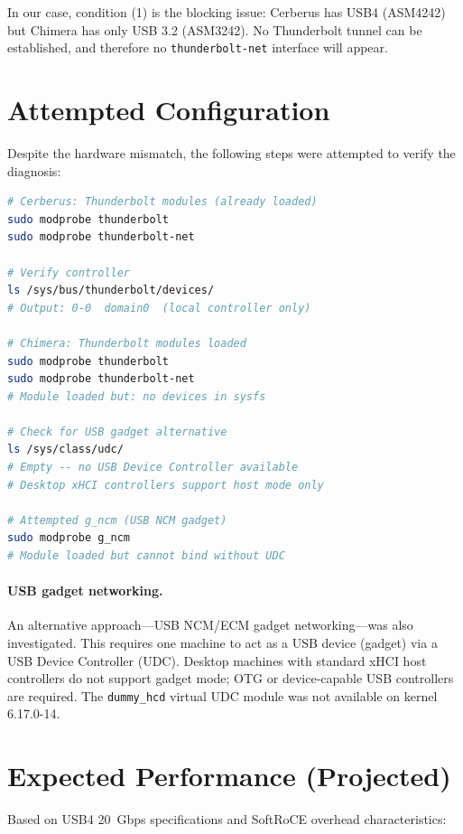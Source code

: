 \documentclass[11pt,letterpaper]{article}
\begin{document}
In our case, condition (1) is the blocking issue: Cerberus has USB4 (ASM4242) but Chimera has only USB 3.2 (ASM3242). No Thunderbolt tunnel can be established, and therefore no \texttt{thunderbolt-net} interface will appear.

\section{Attempted Configuration}

Despite the hardware mismatch, the following steps were attempted to verify the diagnosis:

\begin{lstlisting}[language=bash,caption={USB4 networking setup attempt}]
# Cerberus: Thunderbolt modules (already loaded)
sudo modprobe thunderbolt
sudo modprobe thunderbolt-net

# Verify controller
ls /sys/bus/thunderbolt/devices/
# Output: 0-0  domain0  (local controller only)

# Chimera: Thunderbolt modules loaded
sudo modprobe thunderbolt
sudo modprobe thunderbolt-net
# Module loaded but: no devices in sysfs

# Check for USB gadget alternative
ls /sys/class/udc/
# Empty -- no USB Device Controller available
# Desktop xHCI controllers support host mode only

# Attempted g_ncm (USB NCM gadget)
sudo modprobe g_ncm
# Module loaded but cannot bind without UDC
\end{lstlisting}

\paragraph{USB gadget networking.}
An alternative approach---USB NCM/ECM gadget networking---was also investigated. This requires one machine to act as a USB device (gadget) via a USB Device Controller (UDC). Desktop machines with standard xHCI host controllers do not support gadget mode; OTG or device-capable USB controllers are required. The \texttt{dummy\_hcd} virtual UDC module was not available on kernel 6.17.0-14.

\section{Expected Performance (Projected)}

Based on USB4 20~Gbps specifications and SoftRoCE overhead characteristics:
\end{document}
